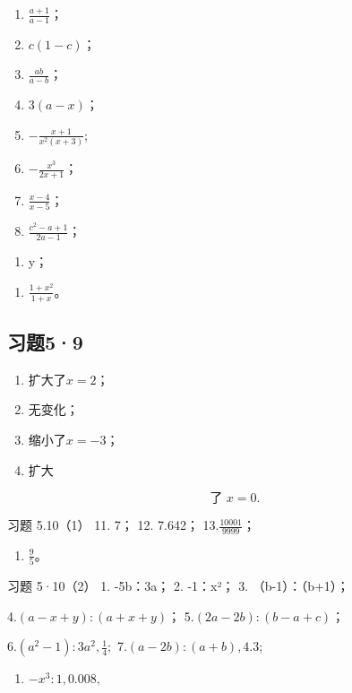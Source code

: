 \begin{enumerate}[start=1]
\item
  \(\frac{a + 1}{a - 1}\)；
\item
  \(c(1 - c)\)；
\item
  \(\frac{ab}{a - b}\)；
\item
  \(3(a-x)\)；
\item
  \(-\frac{x + 1}{x^2(x + 3)};\)
\item
  \(-\frac{x^3}{2x + 1}\)；
\item
  \(\frac{x - 4}{x - 5}\)；
\item
  \(\frac{c^2 - a + 1}{2a - 1}\)；
\end{enumerate}

\begin{enumerate}[start=9]
\item
  y；
\end{enumerate}

\begin{enumerate}[start=10]
\item
  \(\frac{1 + x^2}{1 + x}\)。
\end{enumerate}

\subsection{习题5·9}

\begin{enumerate}
\item
  扩大了\(x = 2\)；
\item
  无变化；
\item
  缩小了\(x = -3\)；
\item
  扩大
\end{enumerate}

\[
\text{ 了 } x = 0.
\]

习题 5.10（1） 11. 7； 12. 7.642； 13.\(\frac{10001}{9999}\)；
\begin{enumerate}[start=14]
\item
  \(\frac{9}{5}\)。
\end{enumerate}

习题 5·10（2） 1. -5b：3a； 2. -1：x²； 3. （b-1）：（b+1）；

4.\((a - x + y):(a + x + y)\)； 5.\((2a - 2b):(b - a + c)\)；

6.\((a^{2} - 1):3a^{2},\frac{1}{4};\) 7.\((a - 2b):(a + b),4.3;\)
\begin{enumerate}[start=8]
\item
  \(-x^{3}:1,0.008,\)
\end{enumerate}

